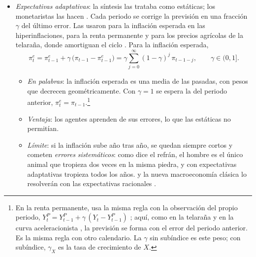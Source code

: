 \documentclass[11pt]{article}
\begin{document}
\begin{itemize}
\begin{enumerate}
  \item \emph{Enfoque marshalliano}: la economía como «máquina para descubrir verdades concretas», que estudia cada problema por separado, con equilibrio parcial y datos, frente al equilibrio general walrasiano, que veía como un ejercicio formal\nocite{Friedman1949Marshallian}. No todos los monetaristas lo compartían:  y , sus aliados, trabajaban en la tradición walrasiana\nocite{BordoSchwartz2003ISLM}.
  \end{enumerate}
\item \emph{Expectativas adaptativas}: la síntesis las trataba como estáticas; los monetaristas las hacen . Cada periodo se corrige la previsión en una fracción $\gamma$ del último error. Las usaron \textcite{Cagan1956Monetary} para la inflación esperada en las hiperinflaciones, \textcite{Friedman1957} para la renta permanente  y \textcite{Nerlove1958Adaptive} para los precios agrícolas de la telaraña, donde amortiguan el ciclo . Para la inflación esperada,
  \begin{equation}
  \pi^e_t=\pi^e_{t-1}+\gamma\,\big(\pi_{t-1}-\pi^e_{t-1}\big)=\gamma\sum_{j=0}^{\infty}(1-\gamma)^j\,\pi_{t-1-j},\qquad \gamma\in(0,1]. \label{eq:expectativas-adaptativas}
  \end{equation}
  \begin{itemize}
  \item \emph{En palabras}: la inflación esperada es una media de las pasadas, con pesos que decrecen geométricamente. Con $\gamma=1$ se espera la del periodo anterior, $\pi^e_t=\pi_{t-1}$.\footnote{En la renta permanente, \textcite{Friedman1957} usa la misma regla con la observación del propio periodo, $Y^P_t=Y^P_{t-1}+\gamma\,(Y_t-Y^P_{t-1})$ ; aquí, como en la telaraña  y en la curva aceleracionista , la previsión se forma con el error del periodo anterior. Es la misma regla con otro calendario. La $\gamma$ sin subíndice es este peso; con subíndice, $\gamma_X$ es la tasa de crecimiento de $X$.}
  \item \emph{Ventaja}: los agentes aprenden de sus errores, lo que las estáticas no permitían.
  \item \emph{Límite}: si la inflación sube año tras año, se quedan siempre cortos y cometen \emph{errores sistemáticos}: como dice el refrán, el hombre es el único animal que tropieza dos veces en la misma piedra, y con expectativas adaptativas tropieza todos los años. \textcite{Muth1961Rational} y la nueva macroeconomía clásica lo resolverán con las expectativas racionales .
  \end{itemize}
\end{itemize}
\end{document}

